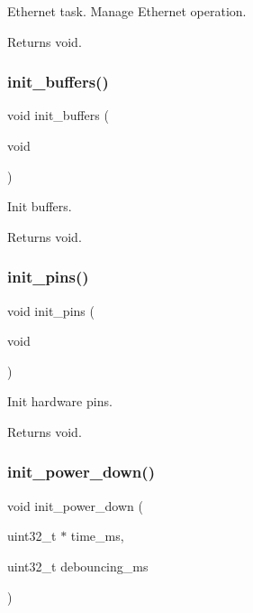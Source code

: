 Ethernet task. Manage Ethernet operation. 

\begin{DoxyReturn}{Returns}
void. 
\end{DoxyReturn}
\mbox{\label{rmap_8ino_ad241cc00b1a92e6d85827df96778e442}} 
\subsubsection{\texorpdfstring{init\+\_\+buffers()}{init\_buffers()}}
{\footnotesize\ttfamily void init\+\_\+buffers (\begin{DoxyParamCaption}\item[{void}]{ }\end{DoxyParamCaption})}



Init buffers. 

\begin{DoxyReturn}{Returns}
void. 
\end{DoxyReturn}
\mbox{\label{rmap_8ino_ad8b80a0c08f928106018edd6ea435b95}} 
\subsubsection{\texorpdfstring{init\+\_\+pins()}{init\_pins()}}
{\footnotesize\ttfamily void init\+\_\+pins (\begin{DoxyParamCaption}\item[{void}]{ }\end{DoxyParamCaption})}



Init hardware pins. 

\begin{DoxyReturn}{Returns}
void. 
\end{DoxyReturn}
\mbox{\label{rmap_8ino_afb98a0f07c30784284f48271ffe02b97}} 
\subsubsection{\texorpdfstring{init\+\_\+power\+\_\+down()}{init\_power\_down()}}
{\footnotesize\ttfamily void init\+\_\+power\+\_\+down (\begin{DoxyParamCaption}\item[{uint32\+\_\+t $\ast$}]{time\+\_\+ms,  }\item[{uint32\+\_\+t}]{debouncing\+\_\+ms }\end{DoxyParamCaption})}




